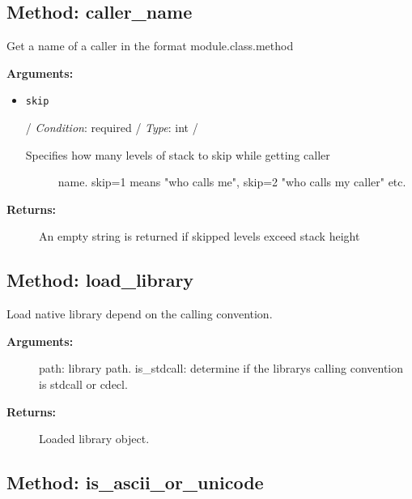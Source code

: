 \hypertarget{qconnectbase-utils-method-caller_name-84}{%
\subsection{Method: caller\_name}\label{qconnectbase-utils-method-caller_name-84}}

Get a name of a caller in the format module.class.method

\textbf{Arguments:}

\begin{itemize}
\item
  \texttt{skip}

  / \emph{Condition}: required / \emph{Type}: int /

  \begin{description}
  \item[Specifies how many levels of stack to skip while getting caller]
  name. skip=1 means "who calls me", skip=2 "who calls my caller" etc.
  \end{description}
\end{itemize}

\begin{description}
\item[\textbf{Returns:}]
An empty string is returned if skipped levels exceed stack height
\end{description}

\hypertarget{qconnectbase-utils-method-load_library-85}{%
\subsection{Method: load\_library}\label{qconnectbase-utils-method-load_library-85}}

Load native library depend on the calling convention.

\begin{description}
\item[\textbf{Arguments:}]
path: library path. is\_stdcall: determine if the
library\textquotesingle s calling convention is stdcall or cdecl.
\item[\textbf{Returns:}]
Loaded library object.
\end{description}

\hypertarget{qconnectbase-utils-method-is_ascii_or_unicode-86}{%
\subsection{Method:
is\_ascii\_or\_unicode}\label{qconnectbase-utils-method-is_ascii_or_unicode-86}}

